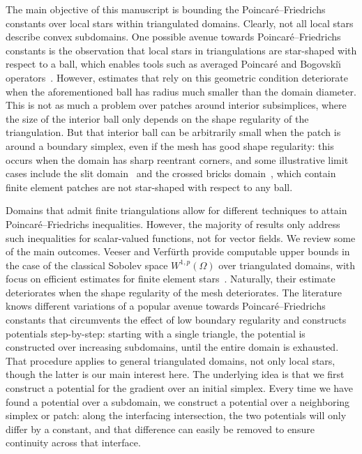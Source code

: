 \documentclass[10pt,letterpaper]{article}
\begin{document}
The main objective of this manuscript is bounding the Poincar\'e--Friedrichs constants over local stars within triangulated domains. 
Clearly, not all local stars describe convex subdomains. 
One possible avenue towards Poincar\'e--Friedrichs constants is the observation that local stars in triangulations are star-shaped with respect to a ball,
which enables tools such as averaged Poincar\'e and Bogovski\u{\i} operators~\cite{costabel2010bogovskiui}. 
However, estimates that rely on this geometric condition deteriorate when the aforementioned ball has radius much smaller than the domain diameter. 
This is not as much a problem over patches around interior subsimplices, where the size of the interior ball only depends on the shape regularity of the triangulation. 
But that interior ball can be arbitrarily small when the patch is around a boundary simplex, even if the mesh has good shape regularity: 
this occurs when the domain has sharp reentrant corners, and some illustrative limit cases include the slit domain~\cite{veeser2012poincare} and the crossed bricks domain~\cite{licht2019smoothed}, %
which contain finite element patches are not star-shaped with respect to any ball. 

Domains that admit finite triangulations allow for different techniques to attain Poincar\'e--Friedrichs inequalities. 
However, the majority of results only address such inequalities for scalar-valued functions, not for vector fields. 
We review some of the main outcomes. 
Veeser and Verf\"urth provide computable upper bounds in the case of the classical Sobolev space $W^{1,p}(\Omega)$ over triangulated domains, with focus on efficient estimates for finite element stars~\cite{veeser2012poincare}. Naturally, their estimate deteriorates when the shape regularity of the mesh deteriorates. 
% 
The literature~\cite{Eym_Gal_Her_00,vohralik2005discrete,ern2020stable,ern2021finite,Chaum_Voh_p_rob_3D_H_curl_23,Voh_loc_glob_H1_24} knows different variations of a popular avenue towards Poincar\'e--Friedrichs constants that circumvents the effect of low boundary regularity and constructs potentials step-by-step: 
starting with a single triangle, the potential is constructed over increasing subdomains, until the entire domain is exhausted. That procedure applies to general triangulated domains, not only local stars, though the latter is our main interest here. 
The underlying idea is that we first construct a potential for the gradient over an initial simplex. 
Every time we have found a potential over a subdomain, we construct a potential over a neighboring simplex or patch:
along the interfacing intersection, the two potentials will only differ by a constant, 
and that difference can easily be removed to ensure continuity across that interface. 
\end{document}
